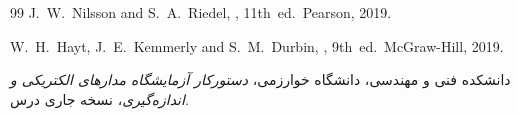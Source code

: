 \begin{thebibliography}{99}
  J.~W.~Nilsson and S.~A.~Riedel,
  \emph{},
  11th~ed.\ Pearson, 2019.

  W.~H.~Hayt, J.~E.~Kemmerly and S.~M.~Durbin,
  \emph{},
  9th~ed.\ McGraw-Hill, 2019.

  دانشکده فنی و مهندسی، دانشگاه خوارزمی،
  \emph{دستورکار آزمایشگاه مدارهای الکتریکی و اندازه‌گیری}،
  نسخه جاری درس.
\end{thebibliography}
